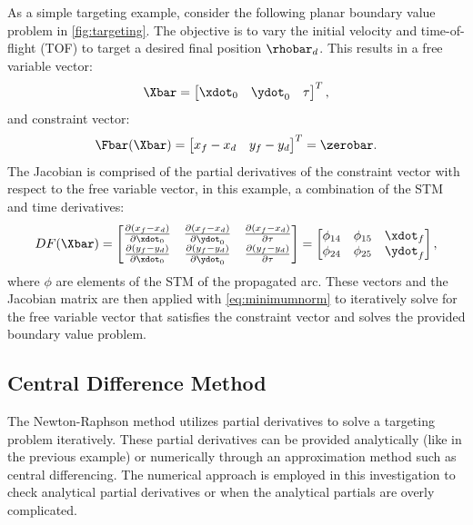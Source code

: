 As a simple targeting example, consider the following planar boundary value problem in
\cref{fig:targeting}. The objective is to vary the initial velocity and time-of-flight (TOF) to
target a desired final position $\rhobar_{d}$. This results in a free variable vector:
\begin{equation}
    \Xbar=\begin{bmatrix}   \xdot_{0}   &   \ydot_{0}   &   \tau    \end{bmatrix}^{T},
    \label{eq:exfreevar}
\end{equation}
and constraint vector:
\begin{equation}
    \Fbar(\Xbar)=\begin{bmatrix}    x_{f}-x_{d} &   y_{f}-y_{d} \end{bmatrix}^{T}=\zerobar.
    \label{eq:exconst}
\end{equation}
The Jacobian is comprised of the partial derivatives of the constraint vector with respect to the
free variable vector, in this example, a combination of the STM and time derivatives:
\begin{equation}
    DF(\Xbar)=\begin{bmatrix}   \frac{\partial(x_{f}-x_{d})}{\partial\xdot_{0}} &   \frac{\partial(x_{f}-x_{d})}{\partial\ydot_{0}} &   \frac{\partial(x_{f}-x_{d})}{\partial\tau}  \\
                                \frac{\partial(y_{f}-y_{d})}{\partial\xdot_{0}} &   \frac{\partial(y_{f}-y_{d})}{\partial\ydot_{0}} &   \frac{\partial(y_{f}-y_{d})}{\partial\tau}  \end{bmatrix}
             =\begin{bmatrix}   \phi_{14}                                       &   \phi_{15}                                       &   \xdot_{f}                                   \\
                                \phi_{24}                                       &   \phi_{25}                                       &   \ydot_{f}                                   \end{bmatrix},
    \label{eq:exJacobian}
\end{equation}
where $\phi$ are elements of the STM of the propagated arc. These vectors and the Jacobian matrix
are then applied with \cref{eq:minimumnorm} to iteratively solve for the free variable vector that
satisfies the constraint vector and solves the provided boundary value problem.

\subsection{Central Difference Method}
The Newton-Raphson method utilizes partial derivatives to solve a targeting problem iteratively.
These partial derivatives can be provided analytically (like in the previous example) or
numerically through an approximation method such as central differencing. The numerical approach is
employed in this investigation to check analytical partial derivatives or when the analytical
partials are overly complicated.

